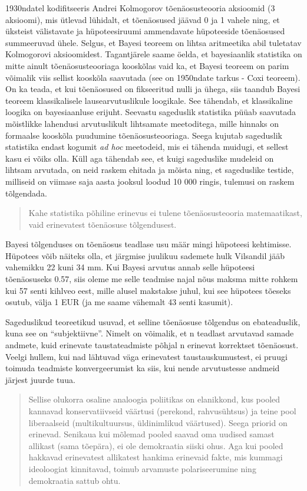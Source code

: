 \documentclass[]{book}
\begin{document}
1930ndatel kodifitseeris Andrei Kolmogorov tõenäosusteooria aksioomid (3
aksioomi), mis ütlevad lühidalt, et tõenäosused jäävad 0 ja 1 vahele
ning, et üksteist välistavate ja hüpoteesiruumi ammendavate hüpoteeside
tõenäosused summeeruvad ühele. Selgus, et Bayesi teoreem on lihtsa
aritmeetika abil tuletatav Kolmogorovi aksioomidest. Tagantjärele saame
öelda, et bayesiaanlik statistika on mitte ainult tõenäosusteooriaga
kooskõlas vaid ka, et Bayesi teoreem on parim võimalik viis sellist
kooskõla saavutada (see on 1950ndate tarkus - Coxi teoreem). On ka
teada, et kui tõenäosused on fikseeritud nulli ja ühega, siis taandub
Bayesi teoreem klassikalisele lausearvutuslikule loogikale. See
tähendab, et klassikaline loogika on bayesiaanluse erijuht. Seevastu
sageduslik statistika püüab saavutada mõistlikke lahendusi arvutuslikult
lihtsamate meetoditega, mille hinnaks on formaalse kooskõla puudumine
tõenäosusteooriaga. Seega kujutab sageduslik statistika endast kogumit
\emph{ad hoc} meetodeid, mis ei tähenda muidugi, et sellest kasu ei
võiks olla. Küll aga tähendab see, et kuigi sageduslike mudeleid on
lihtsam arvutada, on neid raskem ehitada ja mõista ning, et sageduslike
testide, milliseid on viimase saja aasta jooksul loodud 10 000 ringis,
tulemusi on raskem tõlgendada.

\begin{quote}
Kahe statistika põhiline erinevus ei tulene tõenäosusteooria
matemaatikast, vaid erinevatest tõenäosuse tõlgendusest.
\end{quote}

Bayesi tõlgenduses on tõenäosus teadlase usu määr mingi hüpoteesi
kehtimisse. Hüpotees võib näiteks olla, et järgmise juulikuu sademete
hulk Vilsandil jääb vahemikku 22 kuni 34 mm. Kui Bayesi arvutus annab
selle hüpoteesi tõenäosuseks 0.57, siis oleme me selle teadmise najal
nõus maksma mitte rohkem kui 57 senti kihlveo eest, mille alusel
makstakse juhul, kui see hüpotees tõeseks osutub, välja 1 EUR (ja me
saame vähemalt 43 senti kasumit).

Sageduslikud teoreetikud usuvad, et selline tõenäosuse tõlgendus on
ebateaduslik, kuna see on ``subjektiivne''. Nimelt on võimalik, et n
teadlast arvutavad samade andmete, kuid erinevate taustateadmiste põhjal
n erinevat korrektset tõenäosust. Veelgi hullem, kui nad lähtuvad väga
erinevatest taustauskumustest, ei pruugi toimuda teadmiste
konvergeerumist ka siis, kui nende arvutustesse andmeid järjest juurde
tuua.

\begin{quote}
Sellise olukorra osaline analoogia poliitikas on elanikkond, kus pooled
kannavad konservatiivseid väärtusi (perekond, rahvusühtsus) ja teine
pool liberaalseid (multikultuursus, üldinimlikud väärtused). Seega
priorid on erinevad. Senikaua kui mõlemad pooled saavad oma uudised
samast allikast (sama tõepära), ei ole demokraatia siiski ohus. Aga kui
pooled hakkavad erinevatest allikatest hankima erinevaid fakte, mis
kummagi ideoloogiat kinnitavad, toimub arvamuste polariseerumine ning
demokraatia sattub ohtu.
\end{quote}
\end{document}

